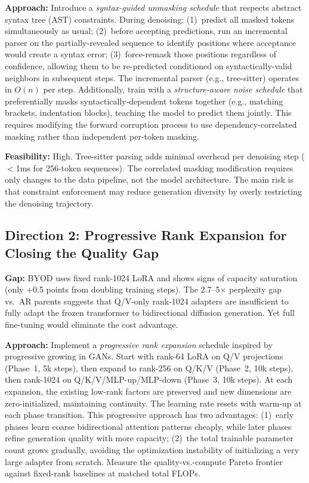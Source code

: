 \documentclass[11pt,a4paper]{article}
\begin{document}
\textbf{Approach:} Introduce a \emph{syntax-guided unmasking schedule} that respects abstract syntax tree (AST) constraints. During denoising: (1)~predict all masked tokens simultaneously as usual; (2)~before accepting predictions, run an incremental parser on the partially-revealed sequence to identify positions where acceptance would create a syntax error; (3)~force-remask those positions regardless of confidence, allowing them to be re-predicted conditioned on syntactically-valid neighbors in subsequent steps. The incremental parser (e.g., tree-sitter) operates in $O(n)$ per step. Additionally, train with a \emph{structure-aware noise schedule} that preferentially masks syntactically-dependent tokens together (e.g., matching brackets, indentation blocks), teaching the model to predict them jointly. This requires modifying the forward corruption process to use dependency-correlated masking rather than independent per-token masking.

\textbf{Feasibility:} High. Tree-sitter parsing adds minimal overhead per denoising step ($<$1ms for 256-token sequences). The correlated masking modification requires only changes to the data pipeline, not the model architecture. The main risk is that constraint enforcement may reduce generation diversity by overly restricting the denoising trajectory.

\subsection{Direction 2: Progressive Rank Expansion for Closing the Quality Gap}
\textbf{Gap:} BYOD uses fixed rank-1024 LoRA and shows signs of capacity saturation (only +0.5 points from doubling training steps). The 2.7--5$\times$ perplexity gap vs.\ AR parents suggests that Q/V-only rank-1024 adapters are insufficient to fully adapt the frozen transformer to bidirectional diffusion generation. Yet full fine-tuning would eliminate the cost advantage.

\textbf{Approach:} Implement a \emph{progressive rank expansion} schedule inspired by progressive growing in GANs. Start with rank-64 LoRA on Q/V projections (Phase~1, 5k steps), then expand to rank-256 on Q/K/V (Phase~2, 10k steps), then rank-1024 on Q/K/V/MLP-up/MLP-down (Phase~3, 10k steps). At each expansion, the existing low-rank factors are preserved and new dimensions are zero-initialized, maintaining continuity. The learning rate resets with warm-up at each phase transition. This progressive approach has two advantages: (1)~early phases learn coarse bidirectional attention patterns cheaply, while later phases refine generation quality with more capacity; (2)~the total trainable parameter count grows gradually, avoiding the optimization instability of initializing a very large adapter from scratch. Measure the quality-vs.-compute Pareto frontier against fixed-rank baselines at matched total FLOPs.
\end{document}
